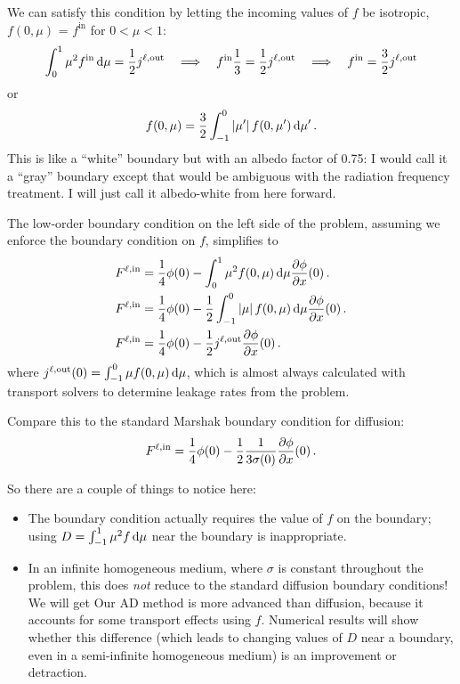 We can satisfy this condition by letting the incoming values of $f$ be
isotropic, $f(0, \mu)$ = $f^\mathrm{in}$ for $0 < \mu < 1$:
\begin{align*}
  \int_{0}^{1} \mu^2 f^\mathrm{in}\mathop{}\!\mathrm{d} \mu
  = \frac{1}{2} j^{\ell,\mathrm{out}}
  \quad \Longrightarrow \quad
  f^\mathrm{in} \frac{1}{3}
  = \frac{1}{2} j^{\ell,\mathrm{out}}
  \quad \Longrightarrow \quad
  f^\mathrm{in} = \frac{3}{2} j^{\ell,\mathrm{out}}
\end{align*}
or
\begin{equation} \label{eq:bndyFOnedIncident}
  f(0, \mu) = \frac{3}{2} \int_{-1}^{0} \left| \mu' \right| f(0, \mu') \mathop{}\!\mathrm{d}\mu' \,.
\end{equation}
This is like a ``white'' boundary but with an albedo factor of 0.75: I would
call it a ``gray'' boundary except that would be ambiguous with the
radiation frequency treatment. I will just call it albedo-white from here
forward.

The low-order boundary condition on the left side of the problem, assuming we
enforce the boundary condition on $f$, simplifies to
\begin{align} \nonumber
  F^{\ell,\mathrm{in}}
  &= \frac{1}{4} \phi(0)
  - \int_{0}^{1} \mu^2 f(0, \mu) \mathop{}\!\mathrm{d} \mu \frac{\partial \phi}{\partial x}(0) \,.
  \\ \nonumber
  F^{\ell,\mathrm{in}}
  &= \frac{1}{4} \phi(0)
  - \frac{1}{2} \int_{-1}^{0} \left| \mu \right| f(0, \mu) \mathop{}\!\mathrm{d}\mu \frac{\partial \phi}{\partial x}(0) \,.
  \\ \label{eq:bndyAnisotropicOnedSs}
  F^{\ell,\mathrm{in}}
  &= \frac{1}{4} \phi(0)
  - \frac{1}{2} j^{\ell,\mathrm{out}} \frac{\partial \phi}{\partial x}(0) \,.
\end{align}
where $j^\mathrm{\ell,out}(0) = \int_{-1}^{0} \mu f(0, \mu) \mathop{}\!\mathrm{d}\mu$, which
is almost always calculated with transport solvers to determine leakage rates
from the problem.

Compare this to the standard Marshak boundary condition for diffusion:
\begin{equation*}
  F^{\ell,\mathrm{in}}
  = \frac{1}{4} \phi(0)
  - \frac{1}{2} \frac{1}{3\sigma(0)} \frac{\partial \phi}{\partial x}(0) \,.
\end{equation*}

So there are a couple of things to notice here:
\begin{itemize}
  \item The boundary condition actually requires the value of $f$ on the
    boundary; using $D=\int_{-1}^{1} \mu^2 f \mathop{}\!\mathrm{d} \mu$ near the boundary is
    inappropriate.
  \item In an infinite homogeneous medium, where $\sigma$ is constant
    throughout the problem, this does \emph{not} reduce to the standard
    diffusion boundary conditions! We will get 
    Our AD method is more advanced than
    diffusion, because it accounts for some transport effects using $f$.
    Numerical results will show whether this difference (which leads to
    changing values of $D$ near a boundary, even in a semi-infinite
    homogeneous medium) is an improvement or detraction.
\end{itemize}
